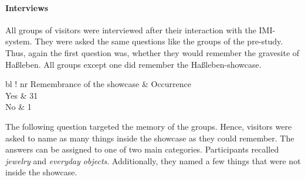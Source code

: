 \paragraph{Interviews} All groups of visitors were interviewed after their interaction with the \ac{IMI}-system. They were asked the same questions like the groups of the pre-study. Thus, again the first question was, whether they would remember the gravesite of Haßleben. All groups except one did remember the Haßleben-showcase.
\begin{table}[H]
	\centering
	\begin{tabular}{ bl !{\vrule width 1pt} nr }
		\rowstyle{\bfseries}
		Remembrance of the showcase	& Occurrence 	\\
		\toprule
		Yes													& 31					\\
		No													& 1						\\
	\end{tabular}
	\caption{Overview of how many participants of the main study remembered the Haßleben-showcase.}
	\label{tab:main_study_question_1}  
\end{table}
The following question targeted the memory of the groups. Hence, visitors were asked to name as many things inside the showcase as they could remember. The answers can be assigned to one of two main categories. Participants recalled \textit{jewelry} and \textit{everyday objects}. Additionally, they named a few things that were not inside the showcase.
